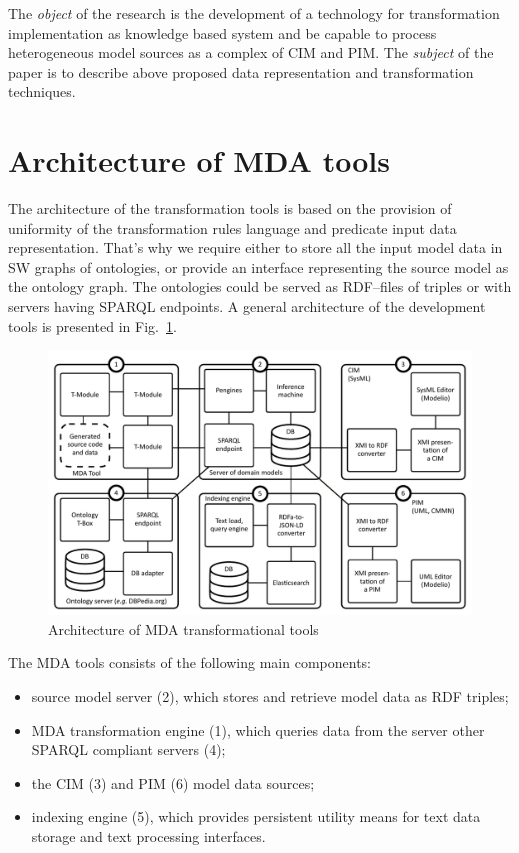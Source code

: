 \documentclass[conference]{IEEEtran}
\begin{document}
The \emph{object} of the research is the development of a technology for transformation implementation as knowledge based system and be capable to process heterogeneous model sources as a complex of CIM and PIM. The \emph{subject} of the paper is to describe above proposed data representation and transformation techniques.

\section{Architecture of MDA tools}


The architecture of the transformation tools is based on the provision of uniformity of the transformation rules language and predicate input data representation.  That's why we require either to store all the input model data in SW graphs of ontologies, or provide an interface representing the source model as the ontology graph.  The ontologies could be served as RDF--files of triples or with servers having SPARQL endpoints.  A general architecture of the development tools is presented in Fig.~\ref{fig:archi}.

\begin{figure}[htb]
  \centering
   \includegraphics[width=1\linewidth]{pics/architecture-mda-lod-ext.pdf}
  \caption{Architecture of MDA transformational tools}
  \label{fig:archi}
\end{figure}

The MDA tools consists of the following main components:
\begin{itemize}
\item source model server (2), which stores and retrieve model data as RDF triples;
\item MDA transformation engine (1), which queries data from the server other SPARQL compliant servers (4);
\item the CIM (3) and PIM (6) model data sources;
\item indexing engine (5), which provides persistent utility means for text data storage and text processing interfaces.
\end{itemize}
\end{document}
